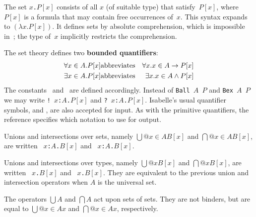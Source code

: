 The set \hbox{\tt{\ttlbrace}$x$.$P[x]${\ttrbrace}} consists of all $x$ (of suitable type)
that satisfy~$P[x]$, where $P[x]$ is a formula that may contain free
occurrences of~$x$.  This syntax expands to $(\lambda
x.P[x])$.  It defines sets by absolute comprehension, which is impossible
in~{\ZF}; the type of~$x$ implicitly restricts the comprehension.

The set theory defines two {\bf bounded quantifiers}:
\begin{eqnarray*}
   \forall x\in A.P[x] &\hbox{abbreviates}& \forall x. x\in A\rightarrow P[x] \\
   \exists x\in A.P[x] &\hbox{abbreviates}& \exists x. x\in A\wedge P[x]
\end{eqnarray*}
The constants~ and~ are defined
accordingly.  Instead of \texttt{Ball $A$ $P$} and \texttt{Bex $A$ $P$} we may
write
%
\hbox{\tt !~$x$:$A$.$P[x]$} and \hbox{\tt ?~$x$:$A$.$P[x]$}.  Isabelle's
usual quantifier symbols,  and , are also accepted
for input.  As with the primitive quantifiers, the {\ML} reference
 specifies which notation to use for output.

Unions and intersections over sets, namely $\bigcup@{x\in A}B[x]$ and
$\bigcap@{x\in A}B[x]$, are written 
~\hbox{\tt$x$:$A$.$B[x]$} and
~\hbox{\tt$x$:$A$.$B[x]$}.  

Unions and intersections over types, namely $\bigcup@x B[x]$ and $\bigcap@x
B[x]$, are written ~\hbox{\tt$x$.$B[x]$} and
~\hbox{\tt$x$.$B[x]$}.  They are equivalent to the previous
union and intersection operators when $A$ is the universal set.

The operators $\bigcup A$ and $\bigcap A$ act upon sets of sets.  They are
not binders, but are equal to $\bigcup@{x\in A}x$ and $\bigcap@{x\in A}x$,
respectively.



